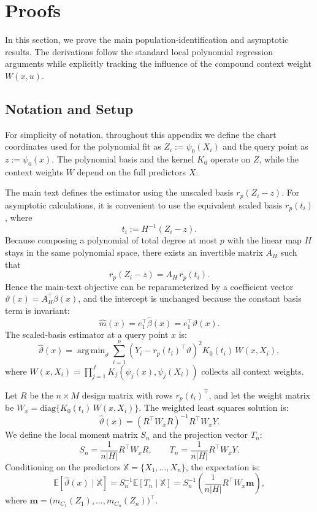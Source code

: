 \documentclass[final,1p,times,authoryear]{elsarticle}
\DeclareMathOperator*{\argmin}{arg\,min}
\newcommand{\E}{\mathbb{E}}
\begin{document}
\clearpage




\newpage

\appendix

\section{Proofs}
\label{app:proofs}

In this section, we prove the main population-identification and asymptotic results. The derivations follow the standard local polynomial regression arguments \citep{fan1996local} while explicitly tracking the influence of the compound context weight $W(x, u)$.

\subsection{Notation and Setup}
For simplicity of notation, throughout this appendix we define the chart coordinates used for the polynomial fit as $Z_i := \psi_0(X_i)$ and the query point as $z := \psi_0(x)$. The polynomial basis and the kernel $K_0$ operate on $Z$, while the context weights $W$ depend on the full predictors $X$.

The main text defines the estimator using the unscaled basis $r_p(Z_i-z)$. For asymptotic calculations, it is convenient to use the equivalent scaled basis $r_p(t_i)$, where
\[
t_i := H^{-1}(Z_i-z).
\]
Because composing a polynomial of total degree at most $p$ with the linear map $H$ stays in the same polynomial space, there exists an invertible matrix $A_H$ such that
\[
r_p(Z_i-z)=A_H\,r_p(t_i).
\]
Hence the main-text objective can be reparameterized by a coefficient vector $\vartheta(x)=A_H^\top\beta(x)$, and the intercept is unchanged because the constant basis term is invariant:
\[
\hat m(x)=e_1^\top\hat\beta(x)=e_1^\top\hat\vartheta(x).
\]
The scaled-basis estimator at a query point $x$ is:
\[
\hat{\vartheta}(x) = \argmin_{\vartheta} \sum_{i=1}^n \left( Y_i - r_p(t_i)^\top \vartheta \right)^2 K_0(t_i)\, W(x, X_i),
\]
where $W(x, X_i) = \prod_{j=1}^J K_j(\psi_j(x), \psi_j(X_i))$ collects all context weights. \newline

Let $R$ be the $n \times M$ design matrix with rows $r_p(t_i)^\top$, and let the weight matrix be $W_x = \text{diag}\{K_0(t_i)\, W(x, X_i)\}$. The weighted least squares solution is:
\[
\hat{\vartheta}(x) = (R^\top W_x R)^{-1} R^\top W_x Y.
\]
We define the local moment matrix $S_n$ and the projection vector $T_n$:
\[
S_n = \frac{1}{n|H|} R^\top W_x R, \quad \quad T_n = \frac{1}{n|H|} R^\top W_x Y.
\]
Conditioning on the predictors $\mathbb{X} = \{X_1, \dots, X_n\}$, the expectation is:
\[
\E[\hat{\vartheta}(x) \mid \mathbb{X}] = S_n^{-1} \E[T_n \mid \mathbb{X}] = S_n^{-1} \left( \frac{1}{n|H|} R^\top W_x \mathbf{m} \right),
\]
where $\mathbf{m} = \big(m_{C_1}(Z_1), \dots, m_{C_n}(Z_n)\big)^\top$.
\end{document}

